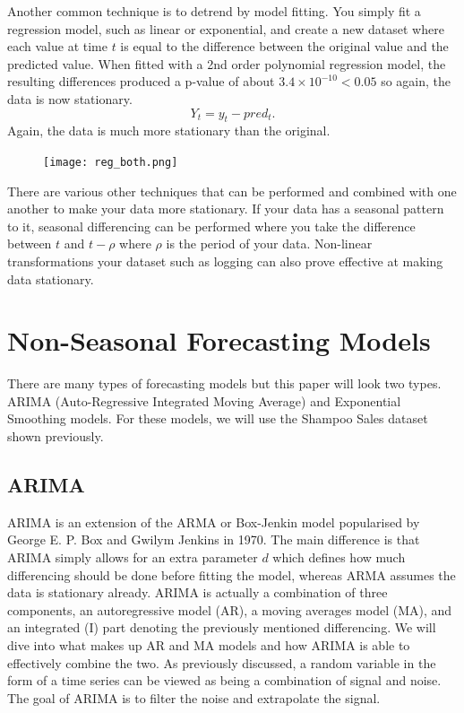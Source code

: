 \documentclass{article}
\begin{document}
    Another common technique is to detrend by model fitting. You simply fit a regression model, such as linear or exponential, and create a new dataset where each value at time $t$ is equal to the difference between the original value and the predicted value.
    When fitted with a 2nd order polynomial regression model, the resulting differences produced a p-value of about $3.4 \times 10^{-10}< 0.05$ so again, the data is now stationary.
    \begin{equation*}
      Y_t = y_t - pred_t.
    \end{equation*}
    Again, the data is much more stationary than the original.
    \begin{figure}[H]
      \centering
      \texttt{[image: reg\_both.png]}
      \caption{}
    \end{figure}
    There are various other techniques that can be performed and combined with one another to make your data more stationary.
    If your data has a seasonal pattern to it, seasonal differencing can be performed where you take the difference between $t$ and $t-\rho$ where $\rho$ is the period of your data.
    Non-linear transformations your dataset such as logging can also prove effective at making data stationary.
  
  \newpage
  
  \section{Non-Seasonal Forecasting Models}
    There are many types of forecasting models but this paper will look two types. ARIMA (Auto-Regressive Integrated Moving Average) and Exponential \\Smoothing models. For these models, we will use the Shampoo Sales dataset shown previously.
  
  \subsection{ARIMA}
    ARIMA is an extension of the ARMA or Box-Jenkin model popularised by George E. P. Box and Gwilym Jenkins in 1970. The main difference is that ARIMA simply allows for an extra parameter $d$ which defines how much differencing should be done before fitting the model, whereas ARMA assumes the data is stationary already. 
    ARIMA is actually a combination of three components, an autoregressive model (AR), a moving averages model (MA), and an integrated (I) part denoting the previously mentioned differencing. We will dive into what makes up AR and MA models and how ARIMA is able to effectively combine the two.
    As previously discussed, a random variable in the form of a time series can be viewed as being a combination of signal and noise. The goal of ARIMA is to filter the noise and extrapolate the signal.
  
\end{document}
